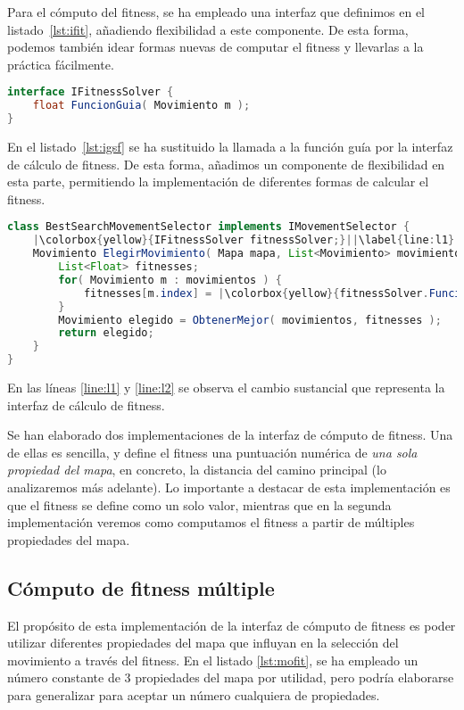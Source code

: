 Para el cómputo del fitness, se ha empleado una interfaz que definimos en el listado~\ref{lst:ifit}, añadiendo flexibilidad a este componente. De esta forma, podemos también idear formas nuevas de computar el fitness y llevarlas a la práctica fácilmente.

\begin{lstlisting}[caption={Interfaz de cómputo de fitness},label={lst:ifit},language=Java]
interface IFitnessSolver {
	float FuncionGuia( Movimiento m );
}
\end{lstlisting}

En el listado~\ref{lst:igsf} se ha sustituido la llamada a la función guía por la interfaz de cálculo de fitness. De esta forma, añadimos un componente de flexibilidad en esta parte, permitiendo la implementación de diferentes formas de calcular el fitness.

\begin{lstlisting}[caption={Interfaz de selección de movimiento basada en búsqueda},label={lst:igsf},language=Java,escapechar=|]
class BestSearchMovementSelector implements IMovementSelector {
	|\colorbox{yellow}{IFitnessSolver fitnessSolver;}||\label{line:l1}|
	Movimiento ElegirMovimiento( Mapa mapa, List<Movimiento> movimientos ) {
		List<Float> fitnesses;
		for( Movimiento m : movimientos ) {
			fitnesses[m.index] = |\colorbox{yellow}{fitnessSolver.FuncionGuia( mapa, m );}||\label{line:l2}|
		}
		Movimiento elegido = ObtenerMejor( movimientos, fitnesses );
		return elegido;
	}
}
\end{lstlisting}

En las líneas \ref{line:l1} y \ref{line:l2} se observa el cambio sustancial que representa la interfaz de cálculo de fitness.

Se han elaborado dos implementaciones de la interfaz de cómputo de fitness. Una de ellas es sencilla, y define el fitness una puntuación numérica de \emph{una sola propiedad del mapa}, en concreto, la distancia del camino principal (lo analizaremos más adelante). Lo importante a destacar de esta implementación es que el fitness se define como un solo valor, mientras que en la segunda implementación veremos como computamos el fitness a partir de múltiples propiedades del mapa.

\subsection{Cómputo de fitness múltiple}

El propósito de esta implementación de la interfaz de cómputo de fitness es poder utilizar diferentes propiedades del mapa que influyan en la selección del movimiento a través del fitness. En el listado \ref{lst:mofit}, se ha empleado un número constante de 3 propiedades del mapa por utilidad, pero podría elaborarse para generalizar para aceptar un número cualquiera de propiedades.

